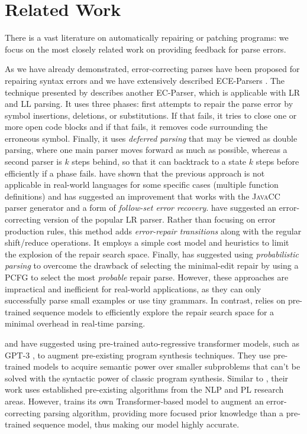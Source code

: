 \section{Related Work}
\label{sec:related-work}

There is a vast literature on automatically repairing or patching programs:
we focus on the most closely related work on providing feedback for parse
errors.

%
As we have already demonstrated, error-correcting parses have been proposed for
repairing syntax errors and we have extensively described ECE-Parsers
\citep{Aho_1972}. The technique presented by \citet{Burke1987} describes another
EC-Parser, which is applicable with LR and LL parsing. It uses three phases:
first attempts to repair the parse error by symbol insertions, deletions, or
substitutions. If that fails, it tries to close one or more open code blocks and if
that fails, it removes code surrounding the erroneous symbol. Finally, it uses
\emph{deferred parsing} that may be viewed as double parsing, where one main
parser moves forward as much as possible, whereas a second parser is $k$ steps
behind, so that it can backtrack to a state $k$ steps before efficiently if a
phase fails. \citet{VanDerSpek_2005} have shown that the previous approach is not
applicable in real-world languages for some specific cases (\eg multiple
function definitions) and has suggested an improvement that works with the
\textsc{JavaCC} parser generator and a form of \emph{follow-set error recovery}.
\citet{Corchuelo2002} have suggested an error-correcting version of the popular
LR parser. Rather than focusing on error production rules, this method adds
\emph{error-repair transitions} along with the regular shift/reduce operations.
It employs a simple cost model and heuristics to limit the explosion of the
repair search space. Finally, \citet{Thompson1976} has suggested using
\emph{probabilistic parsing} to overcome the drawback of selecting the
minimal-edit repair by using a PCFG to select the most \emph{probable} repair
parse. However, these approaches are impractical and inefficient for real-world
applications, as they can only successfully parse small examples or use tiny
grammars. In contrast, \toolname relies on pre-trained sequence models to
efficiently explore the repair search space for a minimal overhead in real-time
parsing.

%
\citet{Rahmani2021} and \citet{Verbruggen2021} have suggested using pre-trained
auto-regressive transformer models, such as \textsc{GPT-3} \citep{GPT2020}, to
augment pre-existing program synthesis techniques. They use pre-trained models
to acquire semantic power over smaller subproblems that can't be solved with the
syntactic power of classic program synthesis. Similar to \toolname, their work
uses established pre-existing algorithms from the NLP and PL research areas.
However, \toolname trains its own Transformer-based model to augment an
error-correcting parsing algorithm, providing more focused prior knowledge than
a pre-trained sequence model, thus making our model highly accurate.

